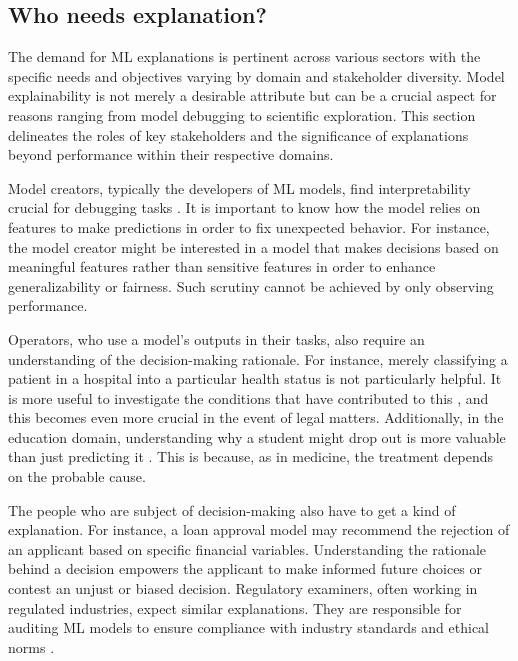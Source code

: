 \subsection{Who needs explanation?}

The demand for ML explanations is pertinent across various sectors with the specific needs and objectives varying by domain and stakeholder diversity. Model explainability is not merely a desirable attribute but can be a crucial aspect for reasons ranging from model debugging to scientific exploration. This section delineates the roles of key stakeholders and the significance of explanations beyond performance within their respective domains.

Model creators, typically the developers of ML models, find interpretability crucial for debugging tasks \cite{Bhatt2020ExplainableDeployment}. It is important to know how the model relies on features to make predictions in order to fix unexpected behavior. For instance, the model creator might be interested in a model that makes decisions based on meaningful features rather than sensitive features in order to enhance generalizability or fairness. Such scrutiny cannot be achieved by only observing performance.

Operators, who use a model's outputs in their tasks, also require an understanding of the decision-making rationale. For instance, merely classifying a patient in a hospital into a particular health status is not particularly helpful. It is more useful to investigate the conditions that have contributed to this \cite{Razavian2015Population-levelFactors}, and this becomes even more crucial in the event of legal matters. Additionally, in the education domain, understanding why a student might drop out is more valuable than just predicting it \cite{Pellagatti2021GeneralizedDropout,Berens2019EarlyMethods}. This is because, as in medicine, the treatment depends on the probable cause.

The people who are subject of decision-making also have to get a kind of explanation. For instance, a loan approval model may recommend the rejection of an applicant based on specific financial variables. Understanding the rationale behind a decision empowers the applicant to make informed future choices or contest an unjust or biased decision. Regulatory examiners, often working in regulated industries, expect similar explanations. They are responsible for auditing ML models to ensure compliance with industry standards and ethical norms \cite{Chen2023Globally-ConsistentEvaluation, Flores2016FalseBlacks}. 

